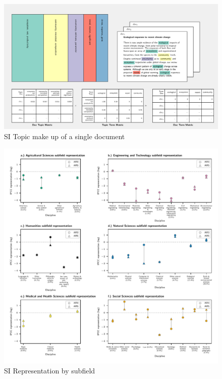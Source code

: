 \documentclass{article}
\begin{document}
\begin{linenumbers}
	
	
	\begin{figure}
		\begin{center}
			\includegraphics[width=1\linewidth]{plots_pub/single_doc_3_536594_1861.pdf}
			\caption{SI Topic make up of a single document}
			\label{doc-topic}
		\end{center}
	\end{figure}

	\begin{figure}
	\begin{center}
		\includegraphics[width=1\linewidth]{plots_pub/ipcc_rep_wcs_simplified.pdf}
		\caption{SI Representation by subfield}
		\label{subfield}
	\end{center}
\end{figure}


\end{linenumbers}
\end{document}
